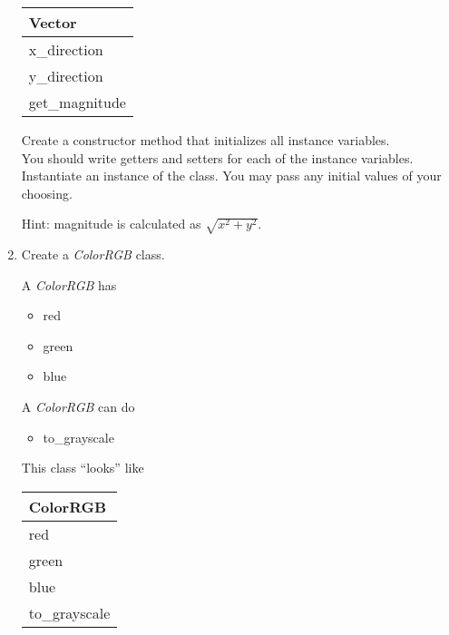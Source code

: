 \documentclass{article}
\begin{document}
\begin{enumerate}
\begin{minipage}{.4\textwidth}
		\vspace*{1em}
		\begin{tabular}{|l|}
			\hline Vector\\ \hline
			x\_direction\\ y\_direction\\ \hline
			get\_magnitude\\  \hline
		\end{tabular}
	\end{minipage}

	\vspace*{2ex}
	Create a constructor method that initializes all instance variables.\\
	You should write getters and setters for each of the instance variables.\\
	Instantiate an instance of the class. You may pass any initial values of your choosing.
	
	Hint: magnitude is calculated as $\sqrt{x^2 + y^2}$.



	\item Create a \textit{ColorRGB} class.
	
	\begin{minipage}{.6\textwidth}		
		A \textit{ColorRGB} has
		\begin{itemize}
			\item red 
			\item green
			\item blue
		\end{itemize}

		A \textit{ColorRGB} can do
		\begin{itemize}
			\item to\_grayscale
		\end{itemize}
	\end{minipage}
	\begin{minipage}{.4\textwidth}
		This class ``looks'' like 
				
		\vspace*{1em}
		\begin{tabular}{|l|}
			\hline ColorRGB\\ \hline
			red\\ green\\ blue\\ \hline
			to\_grayscale\\  \hline
		\end{tabular}
	\end{minipage}


\end{enumerate}
\end{document}
